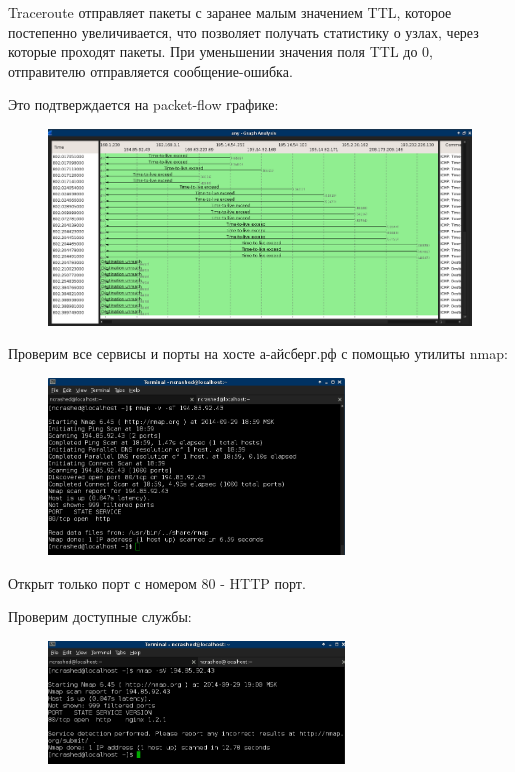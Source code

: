 \documentclass[russian,utf8,emptystyle]{eskdtext}
\begin{document}
Traceroute отправляет пакеты с заранее малым значением TTL, которое постепенно увеличивается, что позволяет получать статистику о  узлах, через которые проходят пакеты. При уменьшении значения поля TTL до 0, отправителю отправляется сообщение-ошибка.

Это подтверждается на packet-flow графике:
\begin{figure}[h!]
\centering
\includegraphics[width=\textwidth]{006}
\end{figure}

Проверим все сервисы и порты на хосте а-айсберг.рф с помощью утилиты nmap:
\begin{figure}[h!]
\centering
\includegraphics[width=0.7\textwidth]{007}
\end{figure}
Открыт только порт с номером 80 - HTTP порт.

Проверим доступные службы:
\begin{figure}[h!]
\centering
\includegraphics[width=0.7\textwidth]{008}
\end{figure}
\end{document}
